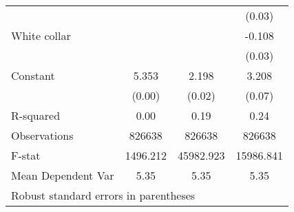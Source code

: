 {\begin{tabular}{l*{3}{c}}
                    &                     &                     &      (0.03)         \\
White collar        &                     &                     &      -0.108\sym{***}\\
                    &                     &                     &      (0.03)         \\
Constant            &       5.353\sym{***}&       2.198\sym{***}&       3.208\sym{***}\\
                    &      (0.00)         &      (0.02)         &      (0.07)         \\
\hline
R-squared           &        0.00         &        0.19         &        0.24         \\
Observations        &      826638         &      826638         &      826638         \\
F-stat              &    1496.212         &   45982.923         &   15986.841         \\
Mean Dependent Var  &        5.35         &        5.35         &        5.35         \\
\hline\hline
\multicolumn{4}{l}{\footnotesize Robust standard errors in parentheses}\\
\end{tabular}
}
